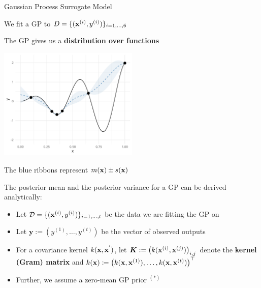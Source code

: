 \documentclass[11pt,compress,t,notes=noshow, xcolor=table]{beamer}
\begin{document}
\begin{vbframe}{Gaussian Process Surrogate Model} 


We fit a GP to $D = \{(\mathbf{x}^{(i)}, y^{(i)})\}_{i = 1, \ldots, 6}$

\lz 

The GP gives us a \textbf{distribution over functions}

\vspace{+.45cm}

\begin{center}
  \includegraphics[width = 0.5\textwidth]{figure_man/bayesian_loop_1.png}
\end{center}

\vspace{0.2cm}

The blue ribbons represent $m(\mathbf{x}) \pm s(\mathbf{x})$

\framebreak 

The posterior mean and the posterior variance for a GP can be derived analytically: 

\begin{itemize}
\item Let $\mathcal{D} = \{(\mathbf{x}^{(i)}, y^{(i)})\}_{i = 1, \ldots, t}$ be the data we are fitting the GP on
\item Let $\bm{y}:= \left(y^{(1)}, \ldots, y^{(t)}\right)$ be the vector of observed outputs
\item For a covariance kernel $k(\mathbf{x}, \mathbf{x}^{'})$, let $\bm{K} := \left(k(\mathbf{x}^{(i)}, \mathbf{x}^{(j)})\right)_{i,j}$ denote the \textbf{kernel (Gram) matrix} and $k(\mathbf{x}) \coloneqq \left(k(\mathbf{x}, \mathbf{x}^{(1)}), \ldots, k(\mathbf{x}, \mathbf{x}^{(t)})\right)^\top$
\item Further, we assume a zero-mean GP prior $^{(*)}$  
\end{itemize}

\vfill


\end{vbframe}
\end{document}

